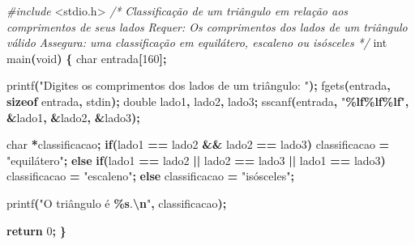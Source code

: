 \documentclass[
  11pt,
  a4paper,
]{scrbook}
\newenvironment{Shaded}{\begin{snugshade}}{\end{snugshade}}
\newcommand{\CommentTok}[1]{\textcolor[rgb]{0.56,0.35,0.01}{\textit{#1}}}
\newcommand{\ControlFlowTok}[1]{\textcolor[rgb]{0.13,0.29,0.53}{\textbf{#1}}}
\newcommand{\DataTypeTok}[1]{\textcolor[rgb]{0.13,0.29,0.53}{#1}}
\newcommand{\DecValTok}[1]{\textcolor[rgb]{0.00,0.00,0.81}{#1}}
\newcommand{\ImportTok}[1]{#1}
\newcommand{\KeywordTok}[1]{\textcolor[rgb]{0.13,0.29,0.53}{\textbf{#1}}}
\newcommand{\NormalTok}[1]{#1}
\newcommand{\OperatorTok}[1]{\textcolor[rgb]{0.81,0.36,0.00}{\textbf{#1}}}
\newcommand{\PreprocessorTok}[1]{\textcolor[rgb]{0.56,0.35,0.01}{\textit{#1}}}
\newcommand{\SpecialCharTok}[1]{\textcolor[rgb]{0.81,0.36,0.00}{\textbf{#1}}}
\newcommand{\StringTok}[1]{\textcolor[rgb]{0.31,0.60,0.02}{#1}}
\begin{document}
\begin{Shaded}
\begin{Highlighting}[]
\PreprocessorTok{\#include }\ImportTok{\textless{}stdio.h\textgreater{}}
\CommentTok{/*}
\CommentTok{Classificação de um triângulo em relação aos comprimentos de seus lados}
\CommentTok{Requer: Os comprimentos dos lados de um triângulo válido}
\CommentTok{Assegura: uma classificação em equilátero, escaleno ou isósceles}
\CommentTok{*/}
\DataTypeTok{int}\NormalTok{ main}\OperatorTok{(}\DataTypeTok{void}\OperatorTok{)} \OperatorTok{\{}
    \DataTypeTok{char}\NormalTok{ entrada}\OperatorTok{[}\DecValTok{160}\OperatorTok{];}

\NormalTok{    printf}\OperatorTok{(}\StringTok{"Digites os comprimentos dos lados de um triângulo: "}\OperatorTok{);}
\NormalTok{    fgets}\OperatorTok{(}\NormalTok{entrada}\OperatorTok{,} \KeywordTok{sizeof}\NormalTok{ entrada}\OperatorTok{,}\NormalTok{ stdin}\OperatorTok{);}
    \DataTypeTok{double}\NormalTok{ lado1}\OperatorTok{,}\NormalTok{ lado2}\OperatorTok{,}\NormalTok{ lado3}\OperatorTok{;}
\NormalTok{    sscanf}\OperatorTok{(}\NormalTok{entrada}\OperatorTok{,} \StringTok{"}\SpecialCharTok{\%lf\%lf\%lf}\StringTok{"}\OperatorTok{,} \OperatorTok{\&}\NormalTok{lado1}\OperatorTok{,} \OperatorTok{\&}\NormalTok{lado2}\OperatorTok{,} \OperatorTok{\&}\NormalTok{lado3}\OperatorTok{);}

    \DataTypeTok{char} \OperatorTok{*}\NormalTok{classificacao}\OperatorTok{;}
    \ControlFlowTok{if}\OperatorTok{(}\NormalTok{lado1 }\OperatorTok{==}\NormalTok{ lado2 }\OperatorTok{\&\&}\NormalTok{ lado2 }\OperatorTok{==}\NormalTok{ lado3}\OperatorTok{)}
\NormalTok{        classificacao }\OperatorTok{=} \StringTok{"equilátero"}\OperatorTok{;}
    \ControlFlowTok{else} \ControlFlowTok{if}\OperatorTok{(}\NormalTok{lado1 }\OperatorTok{==}\NormalTok{ lado2 }\OperatorTok{||}\NormalTok{ lado2 }\OperatorTok{==}\NormalTok{ lado3 }\OperatorTok{||}\NormalTok{ lado1 }\OperatorTok{==}\NormalTok{ lado3}\OperatorTok{)}
\NormalTok{        classificacao }\OperatorTok{=} \StringTok{"escaleno"}\OperatorTok{;}
    \ControlFlowTok{else}
\NormalTok{        classificacao }\OperatorTok{=} \StringTok{"isósceles"}\OperatorTok{;}

\NormalTok{    printf}\OperatorTok{(}\StringTok{"O triângulo é }\SpecialCharTok{\%s}\StringTok{.}\SpecialCharTok{\textbackslash{}n}\StringTok{"}\OperatorTok{,}\NormalTok{ classificacao}\OperatorTok{);}

    \ControlFlowTok{return} \DecValTok{0}\OperatorTok{;}
\OperatorTok{\}}
\end{Highlighting}
\end{Shaded}
\end{document}
